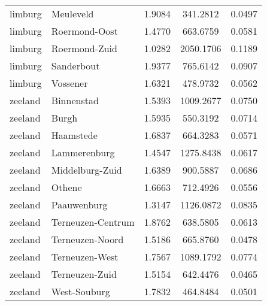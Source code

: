 \begin{longtable}{llccc}
	limburg       & Meuleveld                        & 1.9084  & 341.2812  & 0.0497          \\
	limburg       & Roermond-Oost                    & 1.4770  & 663.6759  & 0.0581          \\
	limburg       & Roermond-Zuid                    & 1.0282  & 2050.1706 & 0.1189          \\
	limburg       & Sanderbout                       & 1.9377  & 765.6142  & 0.0907          \\
	limburg       & Vossener                         & 1.6321  & 478.9732  & 0.0562          \\
	zeeland       & Binnenstad                       & 1.5393  & 1009.2677 & 0.0750          \\
	zeeland       & Burgh                            & 1.5935  & 550.3192  & 0.0714          \\
	zeeland       & Haamstede                        & 1.6837  & 664.3283  & 0.0571          \\
	zeeland       & Lammerenburg                     & 1.4547  & 1275.8438 & 0.0617          \\
	zeeland       & Middelburg-Zuid                  & 1.6389  & 900.5887  & 0.0686          \\
	zeeland       & Othene                           & 1.6663  & 712.4926  & 0.0556          \\
	zeeland       & Paauwenburg                      & 1.3147  & 1126.0872 & 0.0835          \\
	zeeland       & Terneuzen-Centrum                & 1.8762  & 638.5805  & 0.0613          \\
	zeeland       & Terneuzen-Noord                  & 1.5186  & 665.8760  & 0.0478          \\
	zeeland       & Terneuzen-West                   & 1.7567  & 1089.1792 & 0.0774          \\
	zeeland       & Terneuzen-Zuid                   & 1.5154  & 642.4476  & 0.0465          \\
	zeeland       & West-Souburg                     & 1.7832  & 464.8484  & 0.0501          \\
	\hline
\end{longtable}
